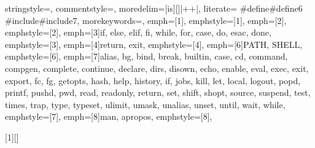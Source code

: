 {stringstyle=\color{Magenta},
commentstyle=\color{red!95!black},
moredelim=[is][\color{ForestGreen}]{|+}{+|},
literate=%
  {\#define}{{{\color{CarnationPink}\#define}}}{6}
  {\#include}{{{\color{CarnationPink}\#include}}}{7},
morekeywords={},
emph=[1]{},
emphstyle=[1]{\color{NavyBlue}}, %
emph=[2]{},
emphstyle=[2]{\color{Orange}}, %
emph=[3]{if, else, elif, fi, while, for, case, do, esac, done},
emphstyle=[3]{\color{Goldenrod}}, %
emph=[4]{return, exit},
emphstyle=[4]{\color{DodgerBlue}}, %
emph=[6]{PATH, SHELL},
emphstyle=[6]{\color{Gray}}, %
emph=[7]{alias, bg, bind, break, builtin, case, cd, command, compgen, complete, continue, declare, dirs, disown, echo, enable, eval,
         exec,  exit,  export,  fc,  fg,  getopts, hash, help, history, if, jobs, kill, let, local, logout, popd, printf, pushd, pwd,
         read,  readonly,  return,  set,  shift,  shopt,  source, suspend,  test,  times,  trap,  type, typeset, ulimit, umask,
         unalias, unset, until, wait, while},
emphstyle=[7]{\color{DarkSlateBlue}}, %
emph=[8]{man, apropos},
emphstyle=[8]{\color{violet}}, %
}

[1][]
    {\lstset{style=MyBash, belowskip=-7mm, aboveskip=3pt, gobble=8, #1}}
    {}

\def\bash{\lstinline[style=MyBash, basicstyle=\ttfamily\color{black}]}


\makeatletter
\newenvironment{CenteredBox}{%
\begin{Sbox}}{%
\end{Sbox}\centerline{\parbox{\wd\@Sbox}{\TheSbox}}}%
\makeatother


